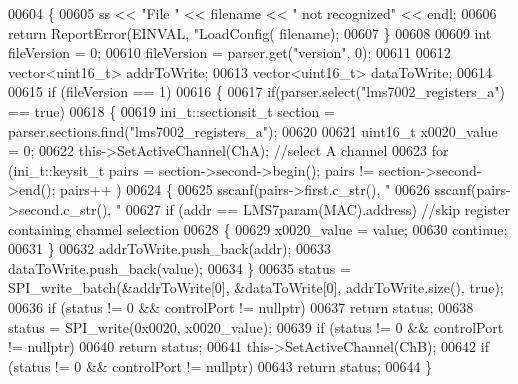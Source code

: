 \begin{DoxyCode}
{{{{{{{{{{{{{{{{00604     \{
00605         ss << \textcolor{stringliteral}{"File "} << filename << \textcolor{stringliteral}{" not recognized"} << endl;
00606         \textcolor{keywordflow}{return} ReportError(EINVAL, \textcolor{stringliteral}{"LoadConfig(%
      filename);
00607     \}
00608 
00609     \textcolor{keywordtype}{int} fileVersion = 0;
00610     fileVersion = parser.get(\textcolor{stringliteral}{"version"}, 0);
00611 
00612     vector<uint16\_t> addrToWrite;
00613     vector<uint16\_t> dataToWrite;
00614 
00615     \textcolor{keywordflow}{if} (fileVersion == 1)
00616     \{
00617         \textcolor{keywordflow}{if}(parser.select(\textcolor{stringliteral}{"lms7002\_registers\_a"}) == \textcolor{keyword}{true})
00618         \{
00619             ini\_t::sectionsit\_t section = parser.sections.find(\textcolor{stringliteral}{"lms7002\_registers\_a"});
00620 
00621             uint16\_t x0020\_value = 0;
00622             this->SetActiveChannel(ChA); \textcolor{comment}{//select A channel}
00623             \textcolor{keywordflow}{for} (ini\_t::keysit\_t pairs = section->second->begin(); pairs != section->second->end(); pairs++
      )
00624             \{
00625                 sscanf(pairs->first.c\_str(), \textcolor{stringliteral}{"%
00626                 sscanf(pairs->second.c\_str(), \textcolor{stringliteral}{"%
00627                 \textcolor{keywordflow}{if} (addr == LMS7param(MAC).address) \textcolor{comment}{//skip register containing channel selection}
00628                 \{
00629                     x0020\_value = value;
00630                     \textcolor{keywordflow}{continue};
00631                 \}
00632                 addrToWrite.push\_back(addr);
00633                 dataToWrite.push\_back(value);
00634             \}
00635             status = SPI_write_batch(&addrToWrite[0], &dataToWrite[0], addrToWrite.size(), \textcolor{keyword}{true});
00636             \textcolor{keywordflow}{if} (status != 0 && controlPort != \textcolor{keyword}{nullptr})
00637                 \textcolor{keywordflow}{return} status;
00638             status = SPI_write(0x0020, x0020\_value);
00639             \textcolor{keywordflow}{if} (status != 0 && controlPort != \textcolor{keyword}{nullptr})
00640                 \textcolor{keywordflow}{return} status;
00641             this->SetActiveChannel(ChB);
00642             \textcolor{keywordflow}{if} (status != 0 && controlPort != \textcolor{keyword}{nullptr})
00643                 \textcolor{keywordflow}{return} status;
00644         \}
}}}}}}}}}}}}}}}}}}}
\end{DoxyCode}
